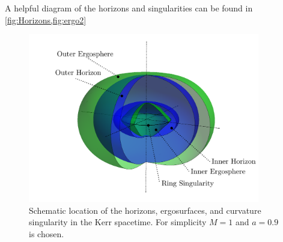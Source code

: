 A helpful diagram of the horizons and singularities can be found in \vref{fig:Horizons,fig:ergo2}
 \begin{figure}[ht!] 
\begin{center}
 \centerline{\includegraphics[width=0.9\textwidth]{img/Chapter1/Horizons.png}}
 \end{center}
 \caption{Schematic location of the horizons, ergosurfaces, and curvature singularity in the Kerr spacetime. For simplicity $M=1$ and $a=0.9$ is chosen.}
 \label{fig:Horizons}
\end{figure}
